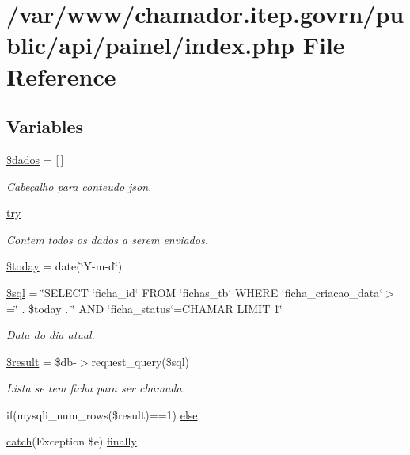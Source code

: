 \hypertarget{painel_2index_8php}{}\section{/var/www/chamador.itep.\+govrn/public/api/painel/index.php File Reference}
\label{painel_2index_8php}
\subsection*{Variables}
\begin{DoxyCompactItemize}
\item 
\hyperlink{painel_2index_8php_a252370d95039a38fa11afab784725d58}{\$dados} = \mbox{[}$\,$\mbox{]}
\begin{DoxyCompactList}\small\item\em Cabeçalho para conteudo json. \end{DoxyCompactList}\item 
\hyperlink{painel_2index_8php_abe4cc9788f52e49485473dc699537388}{try}
\begin{DoxyCompactList}\small\item\em Contem todos os dados a serem enviados. \end{DoxyCompactList}\item 
\hyperlink{painel_2index_8php_af1b7fb9d06cdc6d22c14741fc3cc185a}{\$today} = date(\char`\"{}Y-\/m-\/d\char`\"{})
\item 
\hyperlink{painel_2index_8php_a047170d6020a882807665812a27e2525}{\$sql} = \char`\"{}S\+E\+L\+E\+CT `ficha\+\_\+id` F\+R\+OM `fichas\+\_\+tb` W\+H\+E\+RE `ficha\+\_\+criacao\+\_\+data`$>$=\textquotesingle{}\char`\"{} . \$today . \char`\"{}\textquotesingle{} A\+ND `ficha\+\_\+status`=\textquotesingle{}C\+H\+A\+M\+AR\textquotesingle{} L\+I\+M\+IT 1\char`\"{}
\begin{DoxyCompactList}\small\item\em Data do dia atual. \end{DoxyCompactList}\item 
\hyperlink{painel_2index_8php_a112ef069ddc0454086e3d1e6d8d55d07}{\$result} = \$db-\/$>$request\+\_\+query(\$sql)
\begin{DoxyCompactList}\small\item\em Lista se tem ficha para ser chamada. \end{DoxyCompactList}\item 
if(mysqli\+\_\+num\+\_\+rows(\$result)==1) \hyperlink{painel_2index_8php_ae62fe817d36572be0d1f9c1b61c4e55c}{else}
\item 
\hyperlink{imprimir_2ficha_2index_8php_a8104793004944f01dd070fc8b1ade3c4}{catch}(Exception \$e) \hyperlink{painel_2index_8php_a1eb47d68a4a4f73debf91b15e179d813}{finally}
\end{DoxyCompactItemize}


